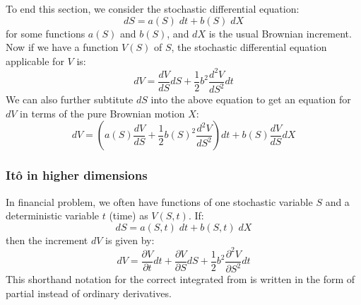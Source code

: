 To end this section, we consider the stochastic differential equation:
\begin{equation}
    dS = a(S) \; dt + b(S) \; dX
\end{equation}
for some functions $a(S)$ and $b(S)$, and $dX$ is the usual Brownian increment. Now if we have a function $V(S)$ of $S$, the stochastic differential equation applicable for $V$ is:
\begin{equation}
    dV = \frac{dV}{dS}dS + \frac{1}{2} b^2 \frac{d^2V}{dS^2}dt
\end{equation}
We can also further subtitute $dS$ into the above equation to get an equation for $dV$ in terms of the pure Brownian motion $X$:
\begin{equation}
    dV = \left( a(S)\frac{dV}{dS} + \frac{1}{2} b(S)^2 \frac{d^2V}{dS^2} \right) dt + b(S) \frac{dV}{dS} dX
\end{equation}



\subsubsection{Itô in higher dimensions}
In financial problem, we often have functions of one stochastic variable $S$ and a deterministic variable $t$ (time) as $V(S,t)$. If:
\begin{equation}
    dS = a(S,t) \; dt + b(S,t) \; dX
\end{equation}
then the increment $dV$ is given by:
\begin{equation}
    dV = \frac{\partial V}{\partial t} dt + \frac{\partial V}{\partial S} dS + \frac{1}{2} b^2 \frac{\partial^2 V}{\partial S^2} dt
\end{equation}
This shorthand notation for the correct integrated from is written in the form of partial instead of ordinary derivatives.

